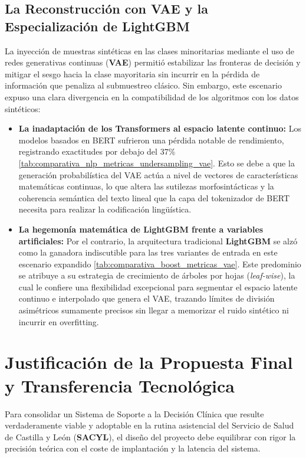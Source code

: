 \documentclass[12pt,a4paper,onecolumn,oneside]{report}
\begin{document}
\subsection{La Reconstrucción con VAE y la Especialización de LightGBM}
La inyección de muestras sintéticas en las clases minoritarias mediante el uso de redes generativas continuas (\textbf{VAE}) permitió estabilizar las fronteras de decisión y mitigar el sesgo hacia la clase mayoritaria sin incurrir en la pérdida de información que penaliza al submuestreo clásico. Sin embargo, este escenario expuso una clara divergencia en la compatibilidad de los algoritmos con los datos sintéticos:
\begin{itemize}
    \item \textbf{La inadaptación de los Transformers al espacio latente continuo:} Los modelos basados en BERT sufrieron una pérdida notable de rendimiento, registrando exactitudes por debajo del $37\%$ \ref{tab:comparativa_nlp_metricas_undersampling_vae}. Esto se debe a que la generación probabilística del VAE actúa a nivel de vectores de características matemáticas continuas, lo que altera las sutilezas morfosintácticas y la coherencia semántica del texto lineal que la capa del tokenizador de BERT necesita para realizar la codificación lingüística.
    \item \textbf{La hegemonía matemática de LightGBM frente a variables artificiales:} Por el contrario, la arquitectura tradicional \textbf{LightGBM} se alzó como la ganadora indiscutible para las tres variantes de entrada en este escenario expandido \ref{tab:comparativa_boost_metricas_vae}. Este predominio se atribuye a su estrategia de crecimiento de árboles por hojas (\textit{leaf-wise}), la cual le confiere una flexibilidad excepcional para segmentar el espacio latente continuo e interpolado que genera el VAE, trazando límites de división asimétricos sumamente precisos sin llegar a memorizar el ruido sintético ni incurrir en overfitting.
\end{itemize}

\section{Justificación de la Propuesta Final y Transferencia Tecnológica}

Para consolidar un Sistema de Soporte a la Decisión Clínica que resulte verdaderamente viable y adoptable en la rutina asistencial del Servicio de Salud de Castilla y León (\textbf{SACYL}), el diseño del proyecto debe equilibrar con rigor la precisión teórica con el coste de implantación y la latencia del sistema. 
\end{document}
